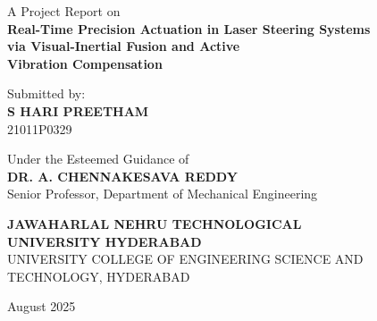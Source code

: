 \documentclass[12pt]{article}
\begin{document}
\begin{titlepage}
    \centering
    {\Large A Project Report on} \\
    \vspace{1.5cm}
    {\Huge \textbf{
Real-Time Precision Actuation in Laser Steering Systems \\[0.1cm]
via Visual-Inertial Fusion and Active\\[0.3cm] Vibration Compensation
}}

    \vspace{2cm}
    
    {\large Submitted by:} \\
    \vspace{0.5cm}
    {\Large \textbf{S HARI PREETHAM}} \\
    {\large 21011P0329} \\
    \vspace{1.5cm}
    
    {\large Under the Esteemed Guidance of} \\
    \vspace{0.5cm}
    {\Large \textbf{DR. A. CHENNAKESAVA REDDY}} \\
    {\large Senior Professor, Department of Mechanical Engineering} \\
    \vfill
    
    
    {\Large \textbf{JAWAHARLAL NEHRU TECHNOLOGICAL \\[0.1cm] UNIVERSITY HYDERABAD}} \\
    \vspace{0.2cm}
    {\large UNIVERSITY COLLEGE OF ENGINEERING SCIENCE AND TECHNOLOGY, HYDERABAD} \\ [0.1cm]
    \vspace{1.5cm}
    
    {\large August 2025}
\end{titlepage}

\pagestyle{plain}
\tableofcontents
\newpage
{} %
\end{document}
